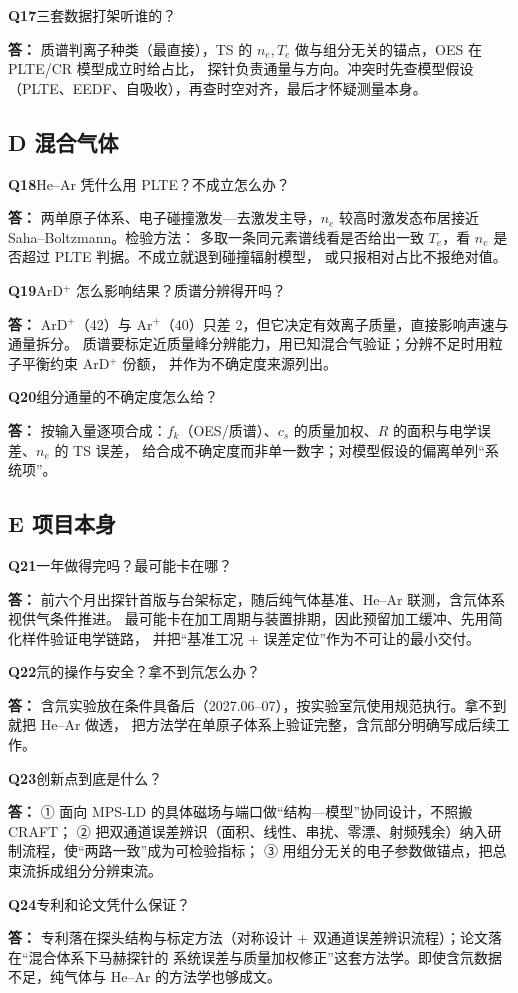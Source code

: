 \documentclass[11pt,a4paper]{ctexart}
\newcommand{\qt}[1]{\par\medskip\noindent\textbf{\color{accent}Q#1}\hspace{0.3em}}
\newcommand{\ans}{\par\noindent\hspace{1.1em}\textbf{答：}}
\begin{document}
\qt{17}三套数据打架听谁的？\ans
质谱判离子种类（最直接），TS 的 $n_e,T_e$ 做与组分无关的锚点，OES 在 PLTE/CR 模型成立时给占比，
探针负责通量与方向。冲突时先查模型假设（PLTE、EEDF、自吸收），再查时空对齐，最后才怀疑测量本身。

\subsection*{D 混合气体}

\qt{18}He--Ar 凭什么用 PLTE？不成立怎么办？\ans
两单原子体系、电子碰撞激发—去激发主导，$n_e$ 较高时激发态布居接近 Saha--Boltzmann。检验方法：
多取一条同元素谱线看是否给出一致 $T_e$，看 $n_e$ 是否超过 PLTE 判据。不成立就退到碰撞辐射模型，
或只报相对占比不报绝对值。

\qt{19}ArD$^+$ 怎么影响结果？质谱分辨得开吗？\ans
ArD$^+$（42）与 Ar$^+$（40）只差 2，但它决定有效离子质量，直接影响声速与通量拆分。
质谱要标定近质量峰分辨能力，用已知混合气验证；分辨不足时用粒子平衡约束 ArD$^+$ 份额，
并作为不确定度来源列出。

\qt{20}组分通量的不确定度怎么给？\ans
按输入量逐项合成：$f_k$（OES/质谱）、$c_s$ 的质量加权、$R$ 的面积与电学误差、$n_e$ 的 TS 误差，
给合成不确定度而非单一数字；对模型假设的偏离单列“系统项”。

\subsection*{E 项目本身}

\qt{21}一年做得完吗？最可能卡在哪？\ans
前六个月出探针首版与台架标定，随后纯气体基准、He--Ar 联测，含氘体系视供气条件推进。
最可能卡在加工周期与装置排期，因此预留加工缓冲、先用简化样件验证电学链路，
并把“基准工况 + 误差定位”作为不可让的最小交付。

\qt{22}氘的操作与安全？拿不到氘怎么办？\ans
含氘实验放在条件具备后（2027.06--07），按实验室氘使用规范执行。拿不到就把 He--Ar 做透，
把方法学在单原子体系上验证完整，含氘部分明确写成后续工作。

\qt{23}创新点到底是什么？\ans
① 面向 MPS-LD 的具体磁场与端口做“结构—模型”协同设计，不照搬 CRAFT；
② 把双通道误差辨识（面积、线性、串扰、零漂、射频残余）纳入研制流程，使“两路一致”成为可检验指标；
③ 用组分无关的电子参数做锚点，把总束流拆成组分分辨束流。

\qt{24}专利和论文凭什么保证？\ans
专利落在探头结构与标定方法（对称设计 + 双通道误差辨识流程）；论文落在“混合体系下马赫探针的
系统误差与质量加权修正”这套方法学。即使含氘数据不足，纯气体与 He--Ar 的方法学也够成文。
\end{document}
